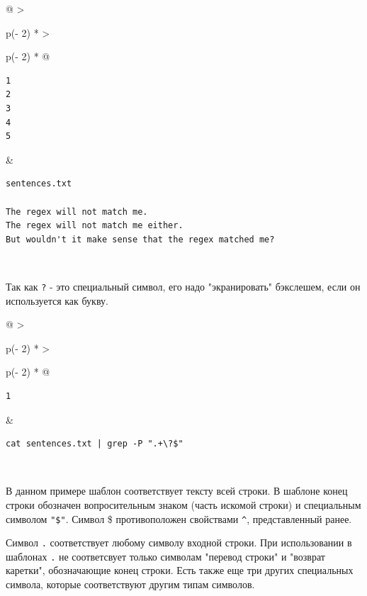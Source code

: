 \documentclass{report}
\begin{document}
\begin{longtable}[]{@{}
  >{\raggedright\arraybackslash}p{(\columnwidth - 2\tabcolsep) * }
  >{\raggedright\arraybackslash}p{(\columnwidth - 2\tabcolsep) * }@{}}
\toprule
\endhead
\begin{minipage}[t]{\linewidth}\raggedright
\begin{verbatim}
1
2
3
4
5
\end{verbatim}
\end{minipage} & \begin{minipage}[t]{\linewidth}\raggedright
\begin{verbatim}
sentences.txt

The regex will not match me.
The regex will not match me either.
But wouldn't it make sense that the regex matched me?
\end{verbatim}
\end{minipage} \\ \addlinespace
\bottomrule
\end{longtable}

Так как \texttt{?} - это специальный символ, его надо "экранировать"
бэкслешем, если он используется как букву.

\begin{longtable}[]{@{}
  >{\raggedright\arraybackslash}p{(\columnwidth - 2\tabcolsep) * }
  >{\raggedright\arraybackslash}p{(\columnwidth - 2\tabcolsep) * }@{}}
\toprule
\endhead
\begin{minipage}[t]{\linewidth}\raggedright
\begin{verbatim}
1
\end{verbatim}
\end{minipage} & \begin{minipage}[t]{\linewidth}\raggedright
\begin{verbatim}
cat sentences.txt | grep -P ".+\?$"
\end{verbatim}
\end{minipage} \\ \addlinespace
\bottomrule
\end{longtable}

В данном примере шаблон соответствует тексту всей строки. В шаблоне
конец строки обозначен вопросительным знаком (часть искомой строки) и
специальным символом \texttt{"\$"}. Символ \$ противоположен свойствами
\texttt{\^{}}, представленный ранее.

Символ \texttt{.} соответствует любому символу входной строки. При
использовании в шаблонах \texttt{.} не соответсвует только символам
"перевод строки" и "возврат каретки", обозначающие конец строки. Есть
также еще три других специальных символа, которые соответствуют другим
типам символов.
\end{document}

